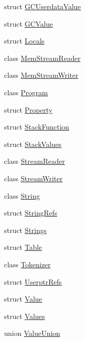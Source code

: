 \begin{DoxyCompactItemize}
\item 
struct \hyperlink{struct_object_script_1_1_o_s_1_1_core_1_1_g_c_userdata_value}{G\+C\+Userdata\+Value}
\item 
struct \hyperlink{struct_object_script_1_1_o_s_1_1_core_1_1_g_c_value}{G\+C\+Value}
\item 
struct \hyperlink{struct_object_script_1_1_o_s_1_1_core_1_1_locals}{Locals}
\item 
class \hyperlink{class_object_script_1_1_o_s_1_1_core_1_1_mem_stream_reader}{Mem\+Stream\+Reader}
\item 
class \hyperlink{class_object_script_1_1_o_s_1_1_core_1_1_mem_stream_writer}{Mem\+Stream\+Writer}
\item 
class \hyperlink{class_object_script_1_1_o_s_1_1_core_1_1_program}{Program}
\item 
struct \hyperlink{struct_object_script_1_1_o_s_1_1_core_1_1_property}{Property}
\item 
struct \hyperlink{struct_object_script_1_1_o_s_1_1_core_1_1_stack_function}{Stack\+Function}
\item 
struct \hyperlink{struct_object_script_1_1_o_s_1_1_core_1_1_stack_values}{Stack\+Values}
\item 
class \hyperlink{class_object_script_1_1_o_s_1_1_core_1_1_stream_reader}{Stream\+Reader}
\item 
class \hyperlink{class_object_script_1_1_o_s_1_1_core_1_1_stream_writer}{Stream\+Writer}
\item 
class \hyperlink{class_object_script_1_1_o_s_1_1_core_1_1_string}{String}
\item 
struct \hyperlink{struct_object_script_1_1_o_s_1_1_core_1_1_string_refs}{String\+Refs}
\item 
struct \hyperlink{struct_object_script_1_1_o_s_1_1_core_1_1_strings}{Strings}
\item 
struct \hyperlink{struct_object_script_1_1_o_s_1_1_core_1_1_table}{Table}
\item 
class \hyperlink{class_object_script_1_1_o_s_1_1_core_1_1_tokenizer}{Tokenizer}
\item 
struct \hyperlink{struct_object_script_1_1_o_s_1_1_core_1_1_userptr_refs}{Userptr\+Refs}
\item 
struct \hyperlink{struct_object_script_1_1_o_s_1_1_core_1_1_value}{Value}
\item 
struct \hyperlink{struct_object_script_1_1_o_s_1_1_core_1_1_values}{Values}
\item 
union \hyperlink{union_object_script_1_1_o_s_1_1_core_1_1_value_union}{Value\+Union}
\end{DoxyCompactItemize}
